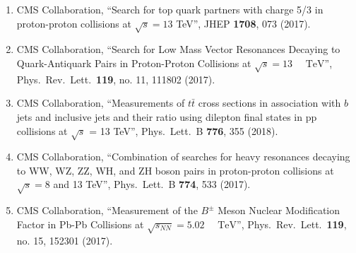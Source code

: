 \begin{enumerate}
\item CMS Collaboration, ``Search for top quark partners with charge 5/3 in proton-proton collisions at $ \sqrt{s}=13 $ TeV'', JHEP {\bf 1708}, 073 (2017).

\item CMS Collaboration, ``Search for Low Mass Vector Resonances Decaying to Quark-Antiquark Pairs in Proton-Proton Collisions at $\sqrt{s}=13\text{ }\text{ }\mathrm{TeV}$'', Phys.\ Rev.\ Lett.\  {\bf 119}, no. 11, 111802 (2017).

\item CMS Collaboration, ``Measurements of $t\bar{t}$ cross sections in association with $b$ jets and inclusive jets and their ratio using dilepton final states in pp collisions at $\sqrt{s}$ = 13 TeV'', Phys.\ Lett.\ B {\bf 776}, 355 (2018).

\item CMS Collaboration, ``Combination of searches for heavy resonances decaying to WW, WZ, ZZ, WH, and ZH boson pairs in proton-proton collisions at $\sqrt{s}=8$ and 13 TeV'', Phys.\ Lett.\ B {\bf 774}, 533 (2017).

\item CMS Collaboration, ``Measurement of the ${B}^{\pm}$ Meson Nuclear Modification Factor in Pb-Pb Collisions at $\sqrt{{s}_{NN}}=5.02\text{ }\text{ }\mathrm{TeV}$'', Phys.\ Rev.\ Lett.\  {\bf 119}, no. 15, 152301 (2017).


\end{enumerate}
